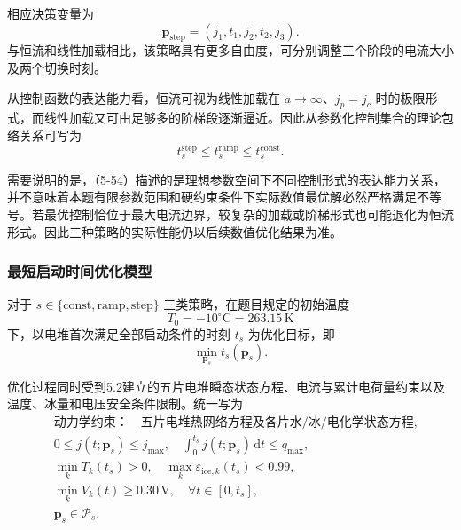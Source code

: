 \documentclass[bwprint]{gmcmthesis}
\numberwithin{figure}{section}
\begin{document}
\begin{itemize}
\noindent 相应决策变量为
\[
\mathbf{p}_{\text{step}} = (j_1, t_1, j_2, t_2, j_3).
\]
与恒流和线性加载相比，该策略具有更多自由度，可分别调整三个阶段的电流大小及两个切换时刻。

\noindent 从控制函数的表达能力看，恒流可视为线性加载在 \(a \to \infty\)、\(j_p = j_c\) 时的极限形式，而线性加载又可由足够多的阶梯段逐渐逼近。因此从参数化控制集合的理论包络关系可写为
\begin{equation}
t_s^{\text{step}} \leq t_s^{\text{ramp}} \leq t_s^{\text{const}}. \tag{5-54}
\end{equation}

\noindent 需要说明的是，（5-54）描述的是理想参数空间下不同控制形式的表达能力关系，并不意味着本题有限参数范围和硬约束条件下实际数值最优解必然严格满足不等号。若最优控制恰位于最大电流边界，较复杂的加载或阶梯形式也可能退化为恒流形式。因此三种策略的实际性能仍以后续数值优化结果为准。


\end{itemize}
\subsubsection{最短启动时间优化模型}

\noindent 对于 \(s \in \{\text{const}, \text{ramp}, \text{step}\}\) 三类策略，在题目规定的初始温度
\[
T_0 = -10^\circ\text{C} = 263.15 \, \text{K}
\]
下，以电堆首次满足全部启动条件的时刻 \(t_s\) 为优化目标，即
\begin{equation}
\min_{\mathbf{p}_s} t_s(\mathbf{p}_s). \tag{5-55}
\end{equation}

\noindent 优化过程同时受到5.2建立的五片电堆瞬态状态方程、电流与累计电荷量约束以及温度、冰量和电压安全条件限制。统一写为
\begin{equation}
\begin{aligned}
& \text{动力学约束：} \quad \text{五片电堆热网络方程及各片水/冰/电化学状态方程,} \\
& 0 \leq j(t; \mathbf{p}_s) \leq j_{\text{max}}, \quad \int_0^{t_s} j(t; \mathbf{p}_s) \, \mathrm{d}t \leq q_{\text{max}}, \\
& \min_k T_k(t_s) > 0, \quad \max_k \varepsilon_{\text{ice},k}(t_s) < 0.99, \\
& \min_k V_k(t) \geq 0.30 \, \text{V}, \quad \forall t \in [0, t_s], \\
& \mathbf{p}_s \in \mathcal{P}_s.
\end{aligned}
\tag{5-56}
\end{equation}
\end{document}
